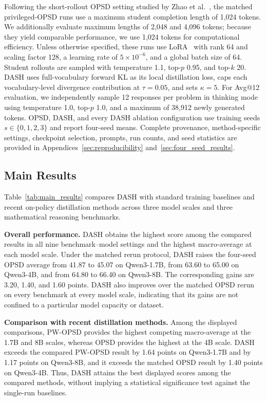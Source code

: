 \documentclass[letterpaper]{article} %
\begin{document}
Following the short-rollout OPSD setting studied by Zhao et al.~\cite{zhao2026selfdistilled}, the matched privileged-OPSD runs use a maximum student completion length of 1,024 tokens. We additionally evaluate maximum lengths of 2,048 and 4,096 tokens; because they yield comparable performance, we use 1,024 tokens for computational efficiency. Unless otherwise specified, these runs use LoRA~\cite{hu2022lora} with rank 64 and scaling factor 128, a learning rate of $5\times10^{-6}$, and a global batch size of 64. Student rollouts are sampled with temperature 1.1, top-$p$ 0.95, and top-$k$ 20. DASH uses full-vocabulary forward KL as its local distillation loss, caps each vocabulary-level divergence contribution at $\tau=0.05$, and sets $\kappa=5$. For Avg@12 evaluation, we independently sample 12 responses per problem in thinking mode using temperature 1.0, top-$p$ 1.0, and a maximum of 38,912 newly generated tokens. OPSD, DASH, and every DASH ablation configuration use training seeds $s\in\{0,1,2,3\}$ and report four-seed means. Complete provenance, method-specific settings, checkpoint selection, prompts, run counts, and seed statistics are provided in Appendices~\ref{sec:reproducibility} and~\ref{sec:four_seed_results}.


\subsection{Main Results}

Table~\ref{tab:main_results} compares DASH with standard training baselines and recent on-policy distillation methods across three model scales and three mathematical reasoning benchmarks.

\noindent\textbf{Overall performance.}
DASH obtains the highest score among the compared results in all nine benchmark--model settings and the highest macro-average at each model scale. Under the matched rerun protocol, DASH raises the four-seed OPSD average from 41.87 to 45.07 on Qwen3-1.7B, from 63.60 to 65.00 on Qwen3-4B, and from 64.80 to 66.40 on Qwen3-8B. The corresponding gains are 3.20, 1.40, and 1.60 points. DASH also improves over the matched OPSD rerun on every benchmark at every model scale, indicating that its gains are not confined to a particular model capacity or dataset.

\noindent\textbf{Comparison with recent distillation methods.}
Among the displayed comparisons, PW-OPSD provides the highest competing macro-average at the 1.7B and 8B scales, whereas OPSD provides the highest at the 4B scale. DASH exceeds the compared PW-OPSD result by 1.64 points on Qwen3-1.7B and by 1.17 points on Qwen3-8B, and it exceeds the matched OPSD result by 1.40 points on Qwen3-4B. Thus, DASH attains the best displayed scores among the compared methods, without implying a statistical significance test against the single-run baselines.
\end{document}
